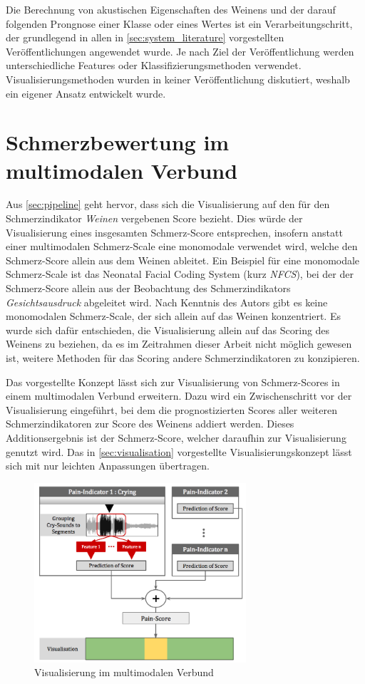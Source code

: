 Die Berechnung von akustischen Eigenschaften des Weinens und der darauf folgenden Prongnose einer Klasse oder eines Wertes ist ein Verarbeitungschritt, der grundlegend in allen in \autoref{sec:system_literature} vorgestellten Veröffentlichungen angewendet wurde. Je nach Ziel der Veröffentlichung werden unterschiedliche Features oder Klassifizierungsmethoden verwendet. Visualisierungsmethoden wurden in keiner Veröffentlichung diskutiert, weshalb ein eigener Ansatz entwickelt wurde.

\section{Schmerzbewertung im multimodalen Verbund}
\label{sec:multimodal_integration}

Aus \autoref{sec:pipeline} geht hervor, dass sich die Visualisierung auf den für den Schmerzindikator \emph{Weinen} vergebenen Score bezieht. Dies würde der Visualisierung eines insgesamten Schmerz-Score entsprechen, insofern anstatt einer multimodalen Schmerz-Scale eine monomodale verwendet wird, welche den Schmerz-Score allein aus dem Weinen ableitet. Ein Beispiel für eine monomodale Schmerz-Scale ist das \glqq Neonatal Facial Coding System\grqq{} (kurz \emph{NFCS}), bei der der Schmerz-Score allein aus der Beobachtung des Schmerzindikators \emph{Gesichtsausdruck} abgeleitet wird.\cite[S. 70]{PainAssessment02} Nach Kenntnis des Autors gibt es keine monomodalen Schmerz-Scale, der sich allein auf das Weinen konzentriert. Es wurde sich dafür entschieden, die Visualisierung allein auf das Scoring des Weinens zu beziehen, da es im Zeitrahmen dieser Arbeit nicht möglich gewesen ist, weitere Methoden für das Scoring andere Schmerzindikatoren zu konzipieren.

Das vorgestellte Konzept lässt sich zur Visualisierung von Schmerz-Scores in einem multimodalen Verbund erweitern. Dazu wird ein Zwischenschritt vor der Visualisierung eingeführt, bei dem die prognostizierten Scores aller weiteren Schmerzindikatoren zur Score des Weinens addiert werden. Dieses Additionsergebnis ist der Schmerz-Score, welcher daraufhin zur Visualisierung genutzt wird. Das in \autoref{sec:visualisation} vorgestellte Visualisierungskonzept lässt sich mit nur leichten Anpassungen übertragen.

\begin{figure}[h]
	\centering
	\includegraphics[width=0.7\textwidth]{bilder/multimodal_viz_02.png}
	\caption{Visualisierung im multimodalen Verbund}
	\label{img:multimodal-overview}
\end{figure}